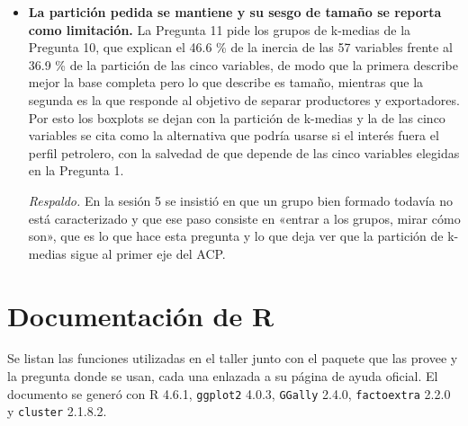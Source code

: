 \documentclass[oneside, openany, fontset=libertinus]{mitthesis}
\newif\ifbibimpresa
\newcommand{\imprimirbibliografia}{\printbibliography[heading=bibintoc]\global\bibimpresatrue}
\begin{document}
\begin{notas}
\begin{itemize}
  \emph{Respaldo.} El enunciado busca caracterizar a los países «en
  términos de importación, exportación, consumo, producción» y en la
  sesión 5 el profesor advirtió que el agrupamiento queda limitado a las
  variables que se le dan y que la segunda componente guardaba una
  separación que se pierde al agrupar sobre la primera, que es lo que
  ocurre aquí con el eje petrolero.
\item
  \textbf{La partición pedida se mantiene y su sesgo de tamaño se
  reporta como limitación.} La Pregunta 11 pide los grupos de k-medias
  de la Pregunta 10, que explican el 46.6 \% de la inercia de las 57
  variables frente al 36.9 \% de la partición de las cinco variables, de
  modo que la primera describe mejor la base completa pero lo que
  describe es tamaño, mientras que la segunda es la que responde al
  objetivo de separar productores y exportadores. Por esto los boxplots
  se dejan con la partición de k-medias y la de las cinco variables se
  cita como la alternativa que podría usarse si el interés fuera el
  perfil petrolero, con la salvedad de que depende de las cinco
  variables elegidas en la Pregunta 1.

  \emph{Respaldo.} En la sesión 5 se insistió en que un grupo bien
  formado todavía no está caracterizado y que ese paso consiste en
  «entrar a los grupos, mirar cómo son», que es lo que hace esta
  pregunta y lo que deja ver que la partición de k-medias sigue al
  primer eje del ACP.
\end{itemize}

\end{notas}

\imprimirbibliografia
\appendix

\chapter{Documentación de R}\label{documentacion-r}

Se listan las funciones utilizadas en el taller junto con el paquete que
las provee y la pregunta donde se usan, cada una enlazada a su página de
ayuda oficial. El documento se generó con R 4.6.1, \texttt{ggplot2}
4.0.3, \texttt{GGally} 2.4.0, \texttt{factoextra} 2.2.0 y
\texttt{cluster} 2.1.8.2.

\Needspace{4.56in}

\Needspace{5.16in}
\end{document}
